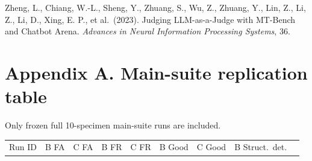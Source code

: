 \documentclass[
  11pt]{article}
\begin{document}
Zheng, L., Chiang, W.-L., Sheng, Y., Zhuang, S., Wu, Z., Zhuang, Y.,
Lin, Z., Li, Z., Li, D., Xing, E. P., et al.~(2023). Judging
LLM-as-a-Judge with MT-Bench and Chatbot Arena. \emph{Advances in Neural
Information Processing Systems}, 36.

\section{Appendix A. Main-suite replication
table}\label{appendix-a.-main-suite-replication-table}

Only frozen full 10-specimen main-suite runs are included.

\begin{longtable}[]{@{}
  >{\raggedright\arraybackslash}p{}
  >{\raggedleft\arraybackslash}p{}
  >{\raggedleft\arraybackslash}p{}
  >{\raggedleft\arraybackslash}p{}
  >{\raggedleft\arraybackslash}p{}
  >{\raggedleft\arraybackslash}p{}
  >{\raggedleft\arraybackslash}p{}
  >{\raggedleft\arraybackslash}p{}
  >{\raggedleft\arraybackslash}p{}@{}}
\toprule\noalign{}
\begin{minipage}[b]{\linewidth}\raggedright
Run ID
\end{minipage} & \begin{minipage}[b]{\linewidth}\raggedleft
B FA
\end{minipage} & \begin{minipage}[b]{\linewidth}\raggedleft
C FA
\end{minipage} & \begin{minipage}[b]{\linewidth}\raggedleft
B FR
\end{minipage} & \begin{minipage}[b]{\linewidth}\raggedleft
C FR
\end{minipage} & \begin{minipage}[b]{\linewidth}\raggedleft
B Good
\end{minipage} & \begin{minipage}[b]{\linewidth}\raggedleft
C Good
\end{minipage} & \begin{minipage}[b]{\linewidth}\raggedleft
B Struct.~det.
\end{minipage} & \begin{minipage}[b]{\linewidth}\raggedleft

\end{minipage}
\end{longtable}
\end{document}
